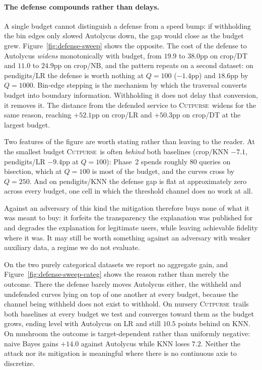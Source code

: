 \documentclass[sigconf,anonymous,review]{acmart}
\newcommand{\sys}{\textsc{Cutpurse}}
\begin{document}
\paragraph{The defense compounds rather than delays.}
A single budget cannot distinguish a defense from a speed bump: if withholding the bin edges only
slowed Autolycus down, the gap would close as the budget grew. Figure~\ref{fig:defense-sweep} shows
the opposite. The cost of the defense to Autolycus \emph{widens} monotonically with budget, from
$19.9$ to $38.0$pp on crop/DT and $11.0$ to $24.9$pp on crop/NB, and the pattern repeats on a second
dataset: on pendigits/LR the defense is worth nothing at $Q{=}100$ ($-1.4$pp) and $18.6$pp by
$Q{=}1000$. Bin-edge stepping is the
mechanism by which the traversal converts budget into boundary information. Withholding it does not
delay that conversion, it removes it. The distance from the defended service to \sys\ widens for the
same reason, reaching $+52.1$pp on crop/LR and $+50.3$pp on crop/DT at the largest budget.

Two features of the figure are worth stating rather than leaving to the reader. At the smallest
budget \sys\ is often \emph{behind} both baselines (crop/KNN $-7.1$, pendigits/LR $-9.4$pp at
$Q{=}100$): Phase~2 spends roughly $80$ queries on bisection, which at $Q{=}100$ is most of the
budget, and the curves cross by $Q{=}250$. And on pendigits/KNN the defense gap is flat at
approximately zero across every budget, one cell in which the threshold channel does no work at all.

Against an adversary of this kind the mitigation therefore buys none of what it was meant to buy: it
forfeits the transparency the explanation was published for and degrades the explanation for
legitimate users, while leaving achievable fidelity where it was. It may still be worth something
against an adversary with weaker auxiliary data, a regime we do not evaluate.

On the two purely categorical datasets we report no aggregate gain, and
Figure~\ref{fig:defense-sweep-categ} shows the reason rather than merely the outcome. There the
defense barely moves Autolycus either, the withheld and undefended curves lying on top of one another
at every budget, because the channel being withheld does not exist to withhold. On nursery \sys\
trails both baselines at every budget we test and converges toward them as the budget grows, ending
level with Autolycus on LR and still $10.5$ points behind on KNN. On mushroom the outcome is
target-dependent rather than uniformly negative: naive Bayes gains $+14.0$ against Autolycus while
KNN loses $7.2$. Neither the attack nor its mitigation is meaningful where there is no continuous
axis to discretize.
\end{document}
